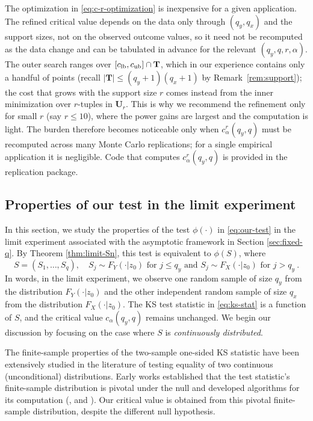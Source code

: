 \documentclass[11pt]{article}
\numberwithin{equation}{section}
\begin{document}
The optimization in \eqref{eq:c-r-optimization} is inexpensive for a given application. The refined critical value depends on the data only through $(q_y,q_x)$ and the support sizes, not on the observed outcome values, so it need not be recomputed as the data change and can be tabulated in advance for the relevant $(q_y,q,r,\alpha)$. The outer search ranges over $[c_{\rm lb},c_{\rm ub}]\cap\mathbf T$, which in our experience contains only a handful of points (recall $|\mathbf T|\le(q_y+1)(q_x+1)$ by Remark~\ref{rem:support}); the cost that grows with the support size $r$ comes instead from the inner minimization over $r$-tuples in $\mathbf U_r$. This is why we recommend the refinement only for small $r$ (say $r\le10$), where the power gains are largest and the computation is light. The burden therefore becomes noticeable only when $c^r_\alpha(q_y,q)$ must be recomputed across many Monte Carlo replications; for a single empirical application it is negligible. Code that computes $c^r_\alpha(q_y,q)$ is provided in the replication package.

\subsection{Properties of our test in the limit experiment}\label{sec:permutations}

In this section, we study the properties of the test $\phi(\cdot)$ in \eqref{eq:our-test} in the limit experiment associated with the asymptotic framework in Section \ref{sec:fixed-q}. By Theorem \ref{thm:limit-Sn}, this test is equivalent to $\phi(S)$, where
\begin{equation}\label{eq:limit-S}
    S = (S_1,\dots, S_q), \quad S_j \sim F_Y(\cdot|z_{0}) \text{ for } j \leq q_y \text{ and } S_j \sim F_X(\cdot|z_{0}) \text{ for } j > q_y~.
\end{equation}
In words, in the limit experiment, we observe one random sample of size $q_y$ from the distribution $F_Y(\cdot|z_{0})$ and the other independent random sample of size $q_x$ from the distribution $F_X(\cdot|z_{0})$. The KS test statistic in \eqref{eq:ks-stat} is a function of $S$, and the critical value $c_{\alpha}(q_y, q)$ remains unchanged. We begin our discussion by focusing on the case where $S$ is \emph{continuously distributed}. 

The finite-sample properties of the two-sample one-sided KS statistic have been extensively studied in the literature of testing equality of two continuous (unconditional) distributions. Early works established that the test statistic's finite-sample distribution is pivotal under the null and developed algorithms for its computation (\cite{gnedenko/korolyuk:1951,korolyuk:1955,blackman:1956,hodges:1958,hajek/sidak:1967}, and \cite{durbin:1973}). Our critical value is obtained from this pivotal finite-sample distribution, despite the different null hypothesis. 
\end{document}
